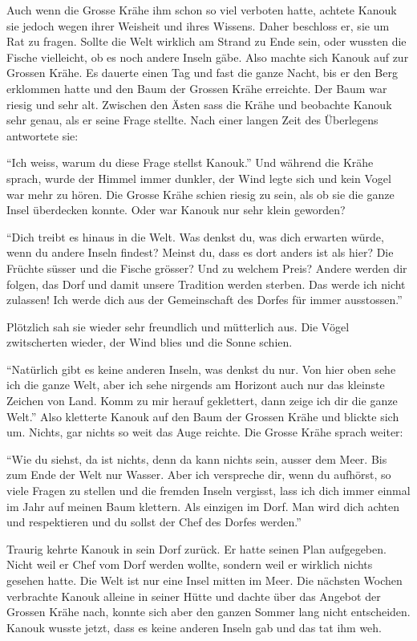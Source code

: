 Auch wenn die Grosse Krähe ihm schon so viel verboten hatte, achtete Kanouk sie jedoch wegen ihrer Weisheit und ihres Wissens. Daher beschloss er, sie um Rat zu fragen. Sollte die Welt wirklich am Strand zu Ende sein, oder wussten die Fische vielleicht, ob es noch andere Inseln gäbe. Also machte sich Kanouk auf zur Grossen Krähe. Es dauerte einen Tag und fast die ganze Nacht, bis er den Berg erklommen hatte und den Baum der Grossen Krähe erreichte. Der Baum war riesig und sehr alt. Zwischen den Ästen sass die Krähe und beobachte Kanouk sehr genau, als er seine Frage stellte. Nach einer langen Zeit des Überlegens antwortete sie:

\enquote{Ich weiss, warum du diese Frage stellst Kanouk.} Und während die Krähe sprach, wurde der Himmel immer dunkler, der Wind legte sich und kein Vogel war mehr zu hören. Die Grosse Krähe schien riesig zu sein, als ob sie die ganze Insel überdecken konnte. Oder war Kanouk nur sehr klein geworden? 

\enquote{Dich treibt es hinaus in die Welt. Was denkst du, was dich erwarten würde, wenn du andere Inseln findest? Meinst du, dass es dort anders ist als hier? Die Früchte süsser und die Fische grösser? Und zu welchem Preis? Andere werden dir folgen, das Dorf und damit unsere Tradition werden sterben. Das werde ich nicht zulassen! Ich werde dich aus der Gemeinschaft des Dorfes für immer ausstossen.} 

Plötzlich sah sie wieder sehr freundlich und mütterlich aus. Die Vögel zwitscherten wieder, der Wind blies und die Sonne schien.

\enquote{Natürlich gibt es keine anderen Inseln, was denkst du nur. Von hier oben sehe ich die ganze Welt, aber ich sehe nirgends am Horizont auch nur das kleinste Zeichen von Land. Komm zu mir herauf geklettert, dann zeige ich dir die ganze Welt.} Also kletterte Kanouk auf den Baum der Grossen Krähe und blickte sich um. Nichts, gar nichts so weit das Auge reichte. Die Grosse Krähe sprach weiter:

\enquote{Wie du siehst, da ist nichts, denn da kann nichts sein, ausser dem Meer. Bis zum Ende der Welt nur Wasser. Aber ich verspreche dir, wenn du aufhörst, so viele Fragen zu stellen und die fremden Inseln vergisst, lass ich dich immer einmal im Jahr auf meinen Baum klettern. Als einzigen im Dorf. Man wird dich achten und respektieren und du sollst der Chef des Dorfes werden.}

Traurig kehrte Kanouk in sein Dorf zurück. Er hatte seinen Plan aufgegeben. Nicht weil er Chef vom Dorf werden wollte, sondern weil er wirklich nichts gesehen hatte. Die Welt ist nur eine Insel mitten im Meer. Die nächsten Wochen verbrachte Kanouk alleine in seiner Hütte und dachte über das Angebot der Grossen Krähe nach, konnte sich aber den ganzen Sommer lang nicht entscheiden. Kanouk wusste jetzt, dass es keine anderen Inseln gab und das tat ihm weh.

